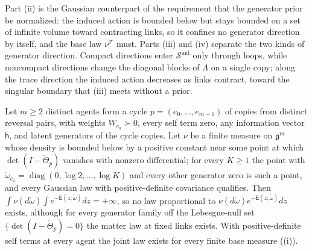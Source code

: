 Part (ii) is the Gaussian counterpart of the requirement that the generator prior be normalized: the
induced action is bounded below but stays bounded on a set of infinite volume toward contracting links,
so it confines no generator direction by itself, and the base law \(\nu^{\mathscr T}\) must. Parts (iii)
and (iv) separate the two kinds of generator direction. Compact directions enter
\(\mathscr S^{\mathrm{ind}}\) only through loops, while noncompact directions change the diagonal blocks
of \(\Lambda\) on a single copy; along the trace direction the induced action decreases as links
contract, toward the singular boundary that (iii) meets without a prior.

Let \(m\geq2\) distinct agents form a cycle \(p=(e_0,\ldots,e_{m-1})\) of copies from distinct
reversal pairs, with weights \(W_{e_a}\succ0\), every self term zero, any information vector
\(\mathsf h\), and latent generators of the cycle copies. Let \(\nu\) be a finite measure on
\(\mathfrak g^m\) whose density is bounded below by a positive constant near some point at which
\(\det(I-\mathring\Theta_p)\) vanishes with nonzero differential; for every \(K\geq1\) the point with
\(\mathring\omega_{e_1}=\operatorname{diag}(0,\log2,\ldots,\log K)\) and every other generator zero is
such a point, and every Gaussian law with positive-definite covariance qualifies. Then
\(\int\nu(d\mathring\omega)\int e^{-\mathsf E(z;\mathring\omega)}dz=+\infty\), so no law proportional to
\(\nu(d\mathring\omega)e^{-\mathsf E(z;\mathring\omega)}dz\) exists, although for every generator family
off the Lebesgue-null set \(\{\det(I-\mathring\Theta_p)=0\}\) the matter law at fixed links exists. With
positive-definite self terms at every agent the joint law exists for every finite base measure
((i)). 

